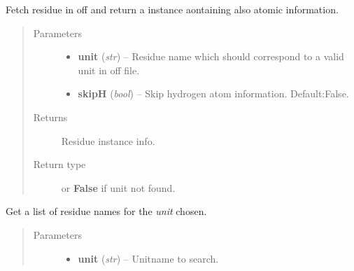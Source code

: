 \documentclass[letterpaper,10pt,english]{sphinxmanual}
\begin{document}
\begin{fulllineitems}
\begin{fulllineitems}
\end{fulllineitems}


\begin{fulllineitems}
\label{OFFManager:pyMDMix.OFFManager.OFFManager.getResidue}
Fetch residue in off and return a {\hyperref[containers:pyMDMix.containers.Residue]{}} instance
aontaining also atomic information.
\begin{quote}\begin{description}
\item[{Parameters}] \leavevmode\begin{itemize}
\item {} 
\textbf{unit} (\emph{str}) -- Residue name which should correspond to a valid unit in off file.

\item {} 
\textbf{skipH} (\emph{bool}) -- Skip hydrogen atom information. Default:False.

\end{itemize}

\item[{Returns}] \leavevmode
Residue instance info.

\item[{Return type}] \leavevmode
{\hyperref[containers:pyMDMix.containers.Residue]{}} or \textbf{False} if unit not found.

\end{description}\end{quote}

\end{fulllineitems}


\begin{fulllineitems}
\label{OFFManager:pyMDMix.OFFManager.OFFManager.getResidueList}
Get a list of residue names for the \emph{unit} chosen.
\begin{quote}\begin{description}
\item[{Parameters}] \leavevmode\begin{itemize}
\item {} 
\textbf{unit} (\emph{str}) -- Unitname to search.


\end{itemize}
\end{description}
\end{quote}
\end{fulllineitems}
\end{fulllineitems}
\end{document}
